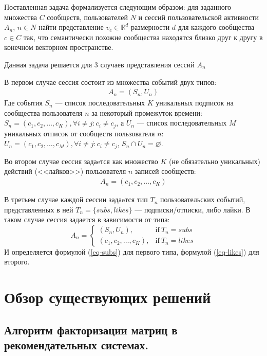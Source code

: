 \documentclass[times,specification,annotation]{itmo-student-thesis}
\begin{document}
Поставленная задача формализуется следующим образом: для заданного множества $C$ сообществ, пользователей $N$ и сессий пользовательской активности $A_n$, $n \in N$ найти представление $v_{c} \in \mathbb{R}^d$ размерности $d$ для каждого сообщества $c \in C$ так, что семантически похожие сообщества находятся близко друг к другу в конечном векторном пространстве. 

Данная задача решается для 3 случаев представления сессий $A_n$
 
В первом случае сессия состоит из множества событий двух типов:
 \begin{align}
A_n = (S_n, U_n) 
\label{eq-subs}
\end{align}
Где события $S_n$ --- список последовательных $K$ уникальных подписок на сообщества пользователя $n$ за некоторый промежуток времени: $S_n = (c_{1}, c_{2}, \dots, c_{K}), \forall i \ne j : c_i \ne c_j$, а $U_n$ --- список последовательных $M$ уникальных отписок от сообществ пользователя $n$: $U_n = (c_{1},  c_{2}, \dots, c_{M}), \forall i \ne j : c_i \ne c_j$, $S_n \cap U_n = \varnothing$.

Во втором случае сессия задаeтся как множество $K$ (не обязательно уникальных) действий (<<лайков>>) пользователя $n$ записей сообществ:
 \begin{align}
A_n = (c_{1}, c_{2}, \dots, c_{K}) 
\label{eq-likes}
\end{align}
 
В третьем случае каждой сессии задаeтся тип $T_n$ пользовательских событий, представленных в ней $T_n = \{subs, likes\}$ --- подписки/отписки, либо лайки. В таком случае сессия задается в зависимости от типа:
\begin{equation}
    A_n =
    \begin{cases}
      (S_n, U_n), & \text{if}\ T_n=subs \\
      (c_{1}, c_{2}, \dots, c_{K}), & \text{if}\ T_n=likes
    \end{cases}  
    \label{eq-combined}
  \end{equation}
 И определяется формулой (\ref{eq-subs}) для первого типа, формулой (\ref{eq-likes}) для второго.

\section{Обзор существующих решений}

\subsection{Алгоритм факторизации матриц в рекомендательных системах.}\label{sec:als}
\end{document}

